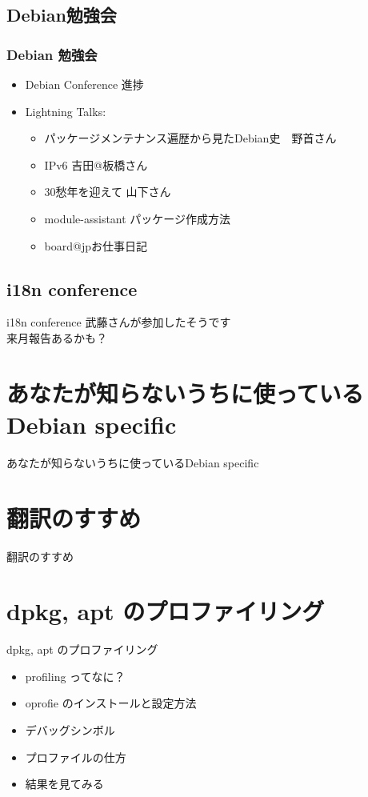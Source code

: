 \documentclass[cjk,dvipdfmx]{beamer}
\begin{document}
\subsection{Debian勉強会}

\begin{frame}
 \frametitle{Debian 勉強会}
 \begin{itemize}
  \item Debian Conference 進捗
  \item Lightning Talks:
	\begin{itemize}
	 \item パッケージメンテナンス遍歴から見たDebian史　野首さん
	 \item IPv6 吉田@板橋さん
	 \item 30愁年を迎えて 山下さん
	 \item module-assistant パッケージ作成方法
	 \item board@jpお仕事日記
	\end{itemize} 
 \end{itemize}
\end{frame}

\subsection{i18n conference}

\begin{frame}{i18n conference}
武藤さんが参加したそうです\\
来月報告あるかも？
\end{frame}

\section{あなたが知らないうちに使っているDebian specific}
\begin{frame}{あなたが知らないうちに使っているDebian specific}
 
\end{frame}

\section{翻訳のすすめ}
\begin{frame}{翻訳のすすめ}
 
\end{frame}

\section{dpkg, apt のプロファイリング}
\begin{frame}{dpkg, apt のプロファイリング}
 \begin{itemize}
  \item profiling ってなに？
  \item oprofie のインストールと設定方法
  \item デバッグシンボル
  \item プロファイルの仕方
  \item 結果を見てみる
 \end{itemize}
\end{frame}
\end{document}
